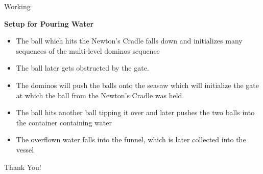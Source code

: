 \documentclass{beamer}
\begin{document}
\begin{frame}{Working}
\begin{itemize}
\item[] \textbf{Setup for Pouring Water}
\begin{itemize}
\item<2-> The ball which hits the Newton's Cradle falls down and initializes many sequences of the multi-level dominos sequence
\item<2-> The ball later gets obstructed by the gate.
\item<3-> The dominos will push the balls onto the seasaw which will initialize the gate at which the ball from the Newton's Cradle was held.  
\item<4-> The ball hits another ball tipping it over and later pushes the two balls into the container containing water
\item<5-> The overflown water falls into the funnel, which is later collected into the vessel
\end{itemize}
\begin{center}
\item[]<6-> \huge{Thank You!}
\end{center}
\end{itemize}
\end{frame}
\end{document}
